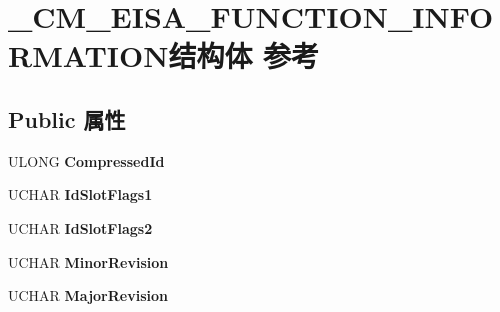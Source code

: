 \hypertarget{struct___c_m___e_i_s_a___f_u_n_c_t_i_o_n___i_n_f_o_r_m_a_t_i_o_n}{}\section{\+\_\+\+C\+M\+\_\+\+E\+I\+S\+A\+\_\+\+F\+U\+N\+C\+T\+I\+O\+N\+\_\+\+I\+N\+F\+O\+R\+M\+A\+T\+I\+O\+N结构体 参考}
\label{struct___c_m___e_i_s_a___f_u_n_c_t_i_o_n___i_n_f_o_r_m_a_t_i_o_n}
\subsection*{Public 属性}
\begin{DoxyCompactItemize}
\item 
\mbox{\label{struct___c_m___e_i_s_a___f_u_n_c_t_i_o_n___i_n_f_o_r_m_a_t_i_o_n_a6195e3de389eee77defb5c17b8ca0df8}} 
U\+L\+O\+NG {\bfseries Compressed\+Id}
\item 
\mbox{\label{struct___c_m___e_i_s_a___f_u_n_c_t_i_o_n___i_n_f_o_r_m_a_t_i_o_n_ae9e37781584d54297a98acf0821da9d4}} 
U\+C\+H\+AR {\bfseries Id\+Slot\+Flags1}
\item 
\mbox{\label{struct___c_m___e_i_s_a___f_u_n_c_t_i_o_n___i_n_f_o_r_m_a_t_i_o_n_a51fa1003279637cfa25cba19d706f1d3}} 
U\+C\+H\+AR {\bfseries Id\+Slot\+Flags2}
\item 
\mbox{\label{struct___c_m___e_i_s_a___f_u_n_c_t_i_o_n___i_n_f_o_r_m_a_t_i_o_n_a0a4df8bd961cd4ef68cf9febb11f31b4}} 
U\+C\+H\+AR {\bfseries Minor\+Revision}
\item 
\mbox{\label{struct___c_m___e_i_s_a___f_u_n_c_t_i_o_n___i_n_f_o_r_m_a_t_i_o_n_af260915b20285b919e9260f305b9004e}} 
U\+C\+H\+AR {\bfseries Major\+Revision}
\item 
\mbox{\label{struct___c_m___e_i_s_a___f_u_n_c_t_i_o_n___i_n_f_o_r_m_a_t_i_o_n_aa8cb8fa30419699f0b60125bc0cccfad}} 

\end{DoxyCompactItemize}
